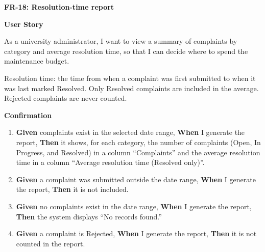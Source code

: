 \noindent\textbf{FR-18: Resolution-time report}\par\nopagebreak[4]\smallskip
\noindent\textbf{User Story}\par\nopagebreak[4]
\noindent As a university administrator, I want to view a summary of complaints by category and average resolution time, so that I can decide where to spend the maintenance budget.\par\smallskip
\noindent Resolution time: the time from when a complaint was first submitted to when it was last marked Resolved. Only Resolved complaints are included in the average. Rejected complaints are never counted.\par\smallskip
{\makeatletter
{}
\makeatother
\noindent\textbf{Confirmation}\par\nopagebreak[4]\vspace{-6pt}\nopagebreak[4]
\begin{enumerate}\setlength{\itemsep}{2pt}\setlength{\parsep}{0pt}\setlength{\topsep}{2pt}\setlength{\partopsep}{0pt}
  \item \textbf{Given} complaints exist in the selected date range, \textbf{When} I generate the report, \textbf{Then} it shows, for each category, the number of complaints (Open, In Progress, and Resolved) in a column ``Complaints'' and the average resolution time in a column ``Average resolution time (Resolved only)''.
  \item \textbf{Given} a complaint was submitted outside the date range, \textbf{When} I generate the report, \textbf{Then} it is not included.
  \item \textbf{Given} no complaints exist in the date range, \textbf{When} I generate the report, \textbf{Then} the system displays ``No records found.''
  \item \textbf{Given} a complaint is Rejected, \textbf{When} I generate the report, \textbf{Then} it is not counted in the report.
\end{enumerate}}
\medskip
 
